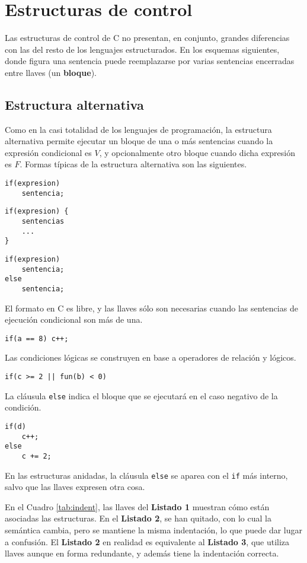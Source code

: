 

\chapter{Estructuras de control}

Las estructuras de control de C no presentan, en conjunto, grandes diferencias
con las del resto de los lenguajes estructurados. En los esquemas siguientes, donde figura una sentencia puede reemplazarse por
varias sentencias encerradas entre llaves (un \textbf{bloque}).

\section{Estructura alternativa}

Como en la casi totalidad de los lenguajes de programación, la estructura alternativa permite ejecutar un bloque de una o más sentencias cuando la expresión condicional es $V$, y opcionalmente otro bloque cuando dicha expresión es $F$.
Formas típicas de la estructura alternativa son las siguientes.

\begin{lstlisting}
if(expresion)
    sentencia;
\end{lstlisting}

\begin{lstlisting}
if(expresion) {
    sentencias
    ...
}
\end{lstlisting}

\begin{lstlisting}
if(expresion)
    sentencia;
else
    sentencia;
\end{lstlisting}

\begin{ejemplo}
El formato en C es libre, y las llaves sólo son necesarias cuando las sentencias de ejecución condicional son más de una. 
\begin{lstlisting}
if(a == 8) c++;
\end{lstlisting}
Las condiciones lógicas se construyen en base a operadores de relación y lógicos. 
\begin{lstlisting}
if(c >= 2 || fun(b) < 0)
\end{lstlisting}
La cláusula \lstinline{else} indica el bloque que se ejecutará en el caso negativo de la condición. 
\begin{lstlisting}
if(d)
	c++;
else
	c += 2;
\end{lstlisting}
En las estructuras anidadas, la cláusula \lstinline{else} se aparea
con el \lstinline{if} más interno, salvo que las llaves expresen otra cosa. 

En el Cuadro \ref{tab:indent}, las llaves del \textbf{Listado 1} muestran cómo están asociadas las estructuras. En el \textbf{Listado 2}, se han quitado, con lo cual la semántica cambia, pero se mantiene la misma indentación, lo que puede dar lugar a confusión. El \textbf{Listado 2} en realidad es equivalente al \textbf{Listado 3}, que utiliza llaves aunque en forma redundante, y además tiene la indentación correcta.
\end{ejemplo}

